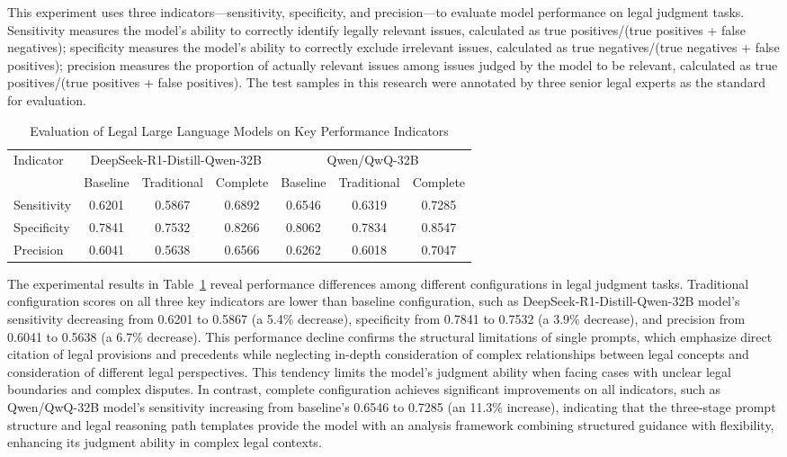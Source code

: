 \documentclass{article}
\theoremstyle{plain}
\theoremstyle{definition}
\begin{document}
This experiment uses three indicators—sensitivity, specificity, and precision—to evaluate model performance on legal judgment tasks. Sensitivity measures the model's ability to correctly identify legally relevant issues, calculated as true positives/(true positives + false negatives); specificity measures the model's ability to correctly exclude irrelevant issues, calculated as true negatives/(true negatives + false positives); precision measures the proportion of actually relevant issues among issues judged by the model to be relevant, calculated as true positives/(true positives + false positives). The test samples in this research were annotated by three senior legal experts as the standard for evaluation.

\begin{table}[htbp]
\centering
\caption{Evaluation of Legal Large Language Models on Key Performance Indicators}
\label{tab2}
\renewcommand{\arraystretch}{1.2}
\begin{tabularx}{\textwidth}{X *{6}{c}}
\toprule
\multirow{2}{*}{Indicator} & \multicolumn{3}{c}{DeepSeek-R1-Distill-Qwen-32B} & \multicolumn{3}{c}{Qwen/QwQ-32B} \\
\cmidrule(lr){2-4} \cmidrule(lr){5-7}
 & Baseline & Traditional & Complete & Baseline & Traditional & Complete \\
\midrule
Sensitivity & 0.6201 & 0.5867 & 0.6892 & 0.6546 & 0.6319 & 0.7285 \\
Specificity & 0.7841 & 0.7532 & 0.8266 & 0.8062 & 0.7834 & 0.8547 \\
Precision & 0.6041 & 0.5638 & 0.6566 & 0.6262 & 0.6018 & 0.7047 \\
\bottomrule
\end{tabularx}
\end{table}

The experimental results in Table~\ref{tab2} reveal performance differences among different configurations in legal judgment tasks. Traditional configuration scores on all three key indicators are lower than baseline configuration, such as DeepSeek-R1-Distill-Qwen-32B model's sensitivity decreasing from 0.6201 to 0.5867 (a 5.4\% decrease), specificity from 0.7841 to 0.7532 (a 3.9\% decrease), and precision from 0.6041 to 0.5638 (a 6.7\% decrease). This performance decline confirms the structural limitations of single prompts, which emphasize direct citation of legal provisions and precedents while neglecting in-depth consideration of complex relationships between legal concepts and consideration of different legal perspectives. This tendency limits the model's judgment ability when facing cases with unclear legal boundaries and complex disputes. In contrast, complete configuration achieves significant improvements on all indicators, such as Qwen/QwQ-32B model's sensitivity increasing from baseline's 0.6546 to 0.7285 (an 11.3\% increase), indicating that the three-stage prompt structure and legal reasoning path templates provide the model with an analysis framework combining structured guidance with flexibility, enhancing its judgment ability in complex legal contexts.
\end{document}
